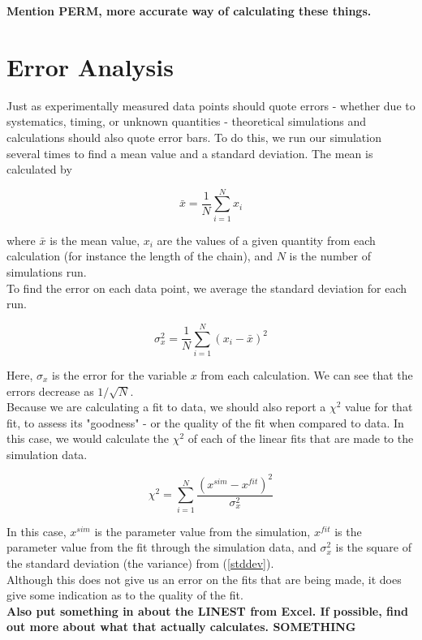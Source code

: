 \documentclass{article}
\begin{document}
\begin{multicols}{2}
\textbf{Mention PERM, more accurate way of calculating these things.}

\appendix

\section{Error Analysis}

Just as experimentally measured data points should quote errors - whether due to systematics, timing, or unknown quantities - theoretical simulations and calculations should also quote error bars.  To do this, we run our simulation several times to find a mean value and a standard deviation.  The mean is calculated by

\begin{equation}
\bar x = \frac{1}{N} \sum \limits _{i=1}^N x_i
\end{equation}

\noindent where $\bar x$ is the mean value, $x_i$ are the values of a given quantity from each calculation (for instance the length of the chain), and $N$ is the number of simulations run.\\

To find the error on each data point, we average the standard deviation for each run.

\begin{equation}
\label{stddev}
\sigma _x^2 = \frac{1}{N} \sum \limits _{i=1} ^N (x_i - \bar x)^2
\end{equation}

\noindent Here, $\sigma _x$ is the error for the variable $x$ from each calculation.  We can see that the errors decrease as $1/\sqrt{N}$.  \\

Because we are calculating a fit to data, we should also report a $\chi ^2$ value for that fit, to assess its "goodness" - or the quality of the fit when compared to data.  \cite{Nunes}  In this case, we would calculate the $\chi^2$ of each of the linear fits that are made to the simulation data.

\begin{equation}
\chi ^2 = \sum \limits _{i=1} ^N \frac{(x^{sim} - x^{fit})^2}{\sigma _x ^2}
\end{equation}

\noindent In this case, $x^{sim}$ is the parameter value from the simulation, $x^{fit}$ is the parameter value from the fit through the simulation data, and $\sigma _x ^2$ is the square of the standard deviation (the variance) from (\ref{stddev}). \\

Although this does not give us an error on the fits that are being made, it does give some indication as to the quality of the fit.\\

\textbf{Also put something in about the LINEST from Excel.  If possible, find out more about what that actually calculates.  SOMETHING}

\end{multicols}


\end{document}
